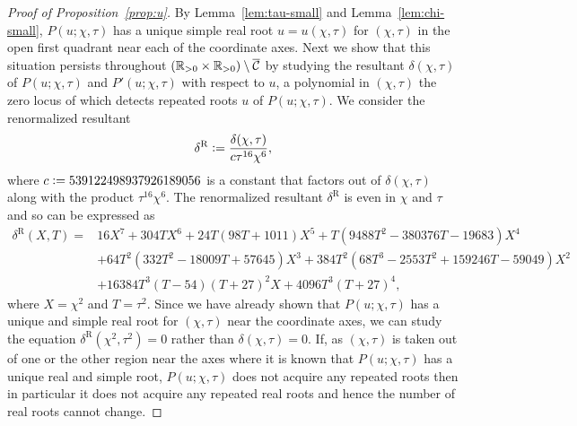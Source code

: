 \begin{proof}[Proof of Proposition~\ref{prop:u}]
By Lemma~\ref{lem:tau-small} and Lemma~\ref{lem:chi-small}, $P(u;\chi,\tau)$ has a unique simple real root $u=u(\chi,\tau)$ for $(\chi,\tau)$ in the open first quadrant near each of the coordinate axes.  Next we show that this situation persists throughout $(\mathbb{R}_{>0}\times\mathbb{R}_{>0})\setminus\overline{\mathcal{C}}$ by studying the resultant $\delta(\chi,\tau)$ of $P(u;\chi,\tau)$ and $P'(u;\chi,\tau)$ with respect to $u$, a polynomial in $(\chi,\tau)$ the zero locus of which detects repeated roots $u$ of $P(u;\chi,\tau)$. 
We consider the renormalized resultant
\begin{equation}
\delta^\mathrm{R}\vcentcolon=\frac{\delta(\chi,\tau)}{c \tau^{16}\chi^{6}},
\end{equation}
where $c \vcentcolon= 539122498937926189056$ is a constant that factors out of $\delta(\chi,\tau)$ along with the product $\tau^{16}\chi^{6}$. The renormalized resultant $\delta^\mathrm{R}$ is even in $\chi$ and $\tau$ and so can be expressed as
\begin{equation}
\begin{aligned}
\delta^\mathrm{R}(X,T) =& 16 X^{7} + 304 T X^{6} + 24 T (98 T + 1011 ) X^{5} + T (9488 T^2  - 380376 T -19683) X^4\\
&+64 T^2 (332 T^2 - 18009 T + 57645)X^3+ 
384T^2 (68 T^3 - 2553 T^2 + 159246 T - 59049 )X^2\\
&+16384  T^3  (T-54)(T+27)^2 X + 4096 T^3 (T+27)^4,
\end{aligned}
\end{equation}
where $X=\chi^2$ and $T=\tau^2$.
Since we have already shown that $P(u;\chi,\tau)$ has a unique and simple real root for $(\chi,\tau)$ near the coordinate axes, we can study the equation $\delta^\mathrm{R}(\chi^2,\tau^2)=0$ rather than $\delta(\chi,\tau)=0$.  If, as $(\chi,\tau)$ is taken out of one or the other region near the axes where it is known that $P(u;\chi,\tau)$ has a unique real and simple root, $P(u;\chi,\tau)$ does not acquire any repeated roots then in particular it does not acquire any repeated real roots and hence the number of real roots cannot change.  


\end{proof}
